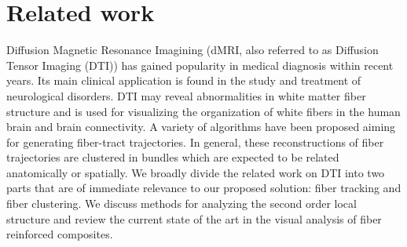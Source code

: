 \section {Related work}
\label{sec:prev_work}

Diffusion Magnetic Resonance Imagining (dMRI, also referred to as Diffusion Tensor Imaging (DTI)) has gained popularity in medical diagnosis within recent years. Its main clinical application is found in the study and treatment of neurological disorders. DTI may reveal abnormalities in white matter fiber structure and is used for visualizing the organization of white fibers in the human brain and  brain connectivity.
A variety of algorithms have been proposed aiming for generating fiber-tract trajectories. In general, these reconstructions of fiber trajectories are  clustered in bundles which are expected to be related anatomically or spatially. 
We broadly divide the related work on DTI into two parts that are of immediate relevance to our proposed solution: fiber tracking and fiber clustering. We discuss  methods for analyzing the second order local structure and review the current state of the art in the visual analysis of fiber reinforced composites.


